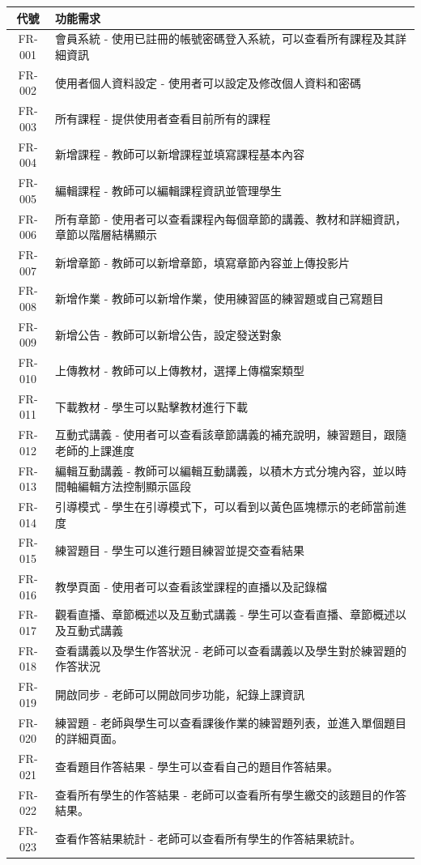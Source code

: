 \documentclass[12pt]{article}
\begin{document}
\begin{table}[H]
  \centering
  \begin{tabular}{|c|p{15cm}|}
    \hline
    \textbf{代號} & \textbf{功能需求} \\
    \hline
    FR-001 & 會員系統 - 使用已註冊的帳號密碼登入系統，可以查看所有課程及其詳細資訊 \\  \hline
    FR-002 & 使用者個人資料設定 - 使用者可以設定及修改個人資料和密碼 \\  \hline
    FR-003 & 所有課程 - 提供使用者查看目前所有的課程 \\  \hline
    FR-004 & 新增課程 - 教師可以新增課程並填寫課程基本內容 \\  \hline
    FR-005 & 編輯課程 - 教師可以編輯課程資訊並管理學生 \\  \hline
    FR-006 & 所有章節 - 使用者可以查看課程內每個章節的講義、教材和詳細資訊，章節以階層結構顯示 \\  \hline
    FR-007 & 新增章節 - 教師可以新增章節，填寫章節內容並上傳投影片 \\  \hline
    FR-008 & 新增作業 - 教師可以新增作業，使用練習區的練習題或自己寫題目 \\  \hline
    FR-009 & 新增公告 - 教師可以新增公告，設定發送對象 \\  \hline
    FR-010 & 上傳教材 - 教師可以上傳教材，選擇上傳檔案類型 \\  \hline
    FR-011 & 下載教材 - 學生可以點擊教材進行下載 \\  \hline
    FR-012 & 互動式講義 - 使用者可以查看該章節講義的補充說明，練習題目，跟隨老師的上課進度 \\  \hline
    FR-013 & 編輯互動講義 - 教師可以編輯互動講義，以積木方式分塊內容，並以時間軸編輯方法控制顯示區段 \\  \hline
    FR-014 & 引導模式 - 學生在引導模式下，可以看到以黃色區塊標示的老師當前進度 \\  \hline
    FR-015 & 練習題目 - 學生可以進行題目練習並提交查看結果 \\  \hline
    FR-016 & 教學頁面 - 使用者可以查看該堂課程的直播以及記錄檔 \\  \hline
    FR-017 & 觀看直播、章節概述以及互動式講義 - 學生可以查看直播、章節概述以及互動式講義 \\  \hline
    FR-018 & 查看講義以及學生作答狀況 - 老師可以查看講義以及學生對於練習題的作答狀況 \\  \hline
    FR-019 & 開啟同步 - 老師可以開啟同步功能，紀錄上課資訊 \\  \hline
    FR-020 & 練習題 - 老師與學生可以查看課後作業的練習題列表，並進入單個題目的詳細頁面。\\ \hline
    FR-021 & 查看題目作答結果 - 學生可以查看自己的題目作答結果。 \\ \hline
    FR-022 & 查看所有學生的作答結果 - 老師可以查看所有學生繳交的該題目的作答結果。 \\ \hline 
    FR-023 & 查看作答結果統計 - 老師可以查看所有學生的作答結果統計。 \\ \hline
  \end{tabular}
\end{table}
\end{document}
